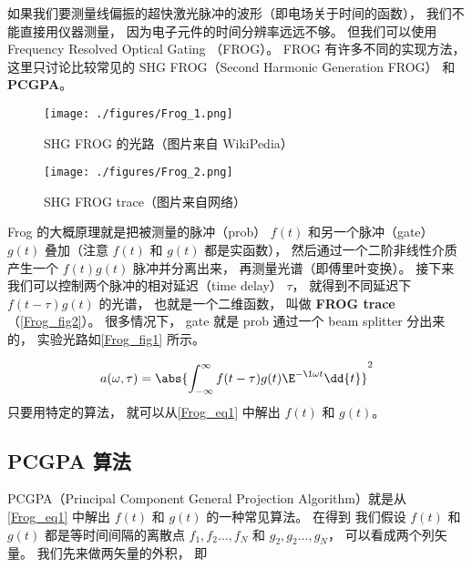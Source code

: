 
\begin{issues}
\issueMissDepend
\end{issues}

如果我们要测量线偏振的超快激光脉冲的波形（即电场关于时间的函数）， 我们不能直接用仪器测量， 因为电子元件的时间分辨率远远不够。 但我们可以使用 Frequency Resolved Optical Gating （FROG）。 FROG 有许多不同的实现方法， 这里只讨论比较常见的 SHG FROG（Second Harmonic Generation FROG） 和 \textbf{PCGPA}。

\begin{figure}[ht]
\centering
\texttt{[image: ./figures/Frog\_1.png]}
\caption{SHG FROG 的光路（图片来自 WikiPedia）} \label{Frog_fig1}
\end{figure}

\begin{figure}[ht]
\centering
\texttt{[image: ./figures/Frog\_2.png]}
\caption{SHG FROG trace（图片来自网络）} \label{Frog_fig2}
\end{figure}

Frog 的大概原理就是把被测量的脉冲（prob） $f(t)$ 和另一个脉冲（gate） $g(t)$ 叠加（注意 $f(t)$ 和 $g(t)$ 都是实函数）， 然后通过一个二阶非线性介质产生一个 $f(t)g(t)$ 脉冲并分离出来， 再测量光谱（即傅里叶变换）。 接下来我们可以控制两个脉冲的相对延迟（time delay） $\tau$， 就得到不同延迟下 $f(t - \tau)g(t)$ 的光谱， 也就是一个二维函数， 叫做 \textbf{FROG trace}（\autoref{Frog_fig2}）。 很多情况下， gate 就是 prob 通过一个 beam splitter 分出来的， 实验光路如\autoref{Frog_fig1} 所示。%

\begin{equation}\label{Frog_eq1}
a(\omega, \tau) = \abs{\int_{-\infty}^{\infty} f(t-\tau) g(t) \E^{-\I\omega t} \dd{t}}^2
\end{equation}
只要用特定的算法， 就可以从\autoref{Frog_eq1} 中解出 $f(t)$ 和 $g(t)$。

\subsection{PCGPA 算法}

PCGPA（Principal Component General Projection Algorithm）就是从\autoref{Frog_eq1} 中解出 $f(t)$ 和 $g(t)$ 的一种常见算法。 在得到 我们假设 $f(t)$ 和 $g(t)$ 都是等时间间隔的离散点 $f_1, f_2\dots, f_N$ 和 $g_2, g_2\dots, g_N$， 可以看成两个列矢量。 我们先来做两矢量的外积， 即

